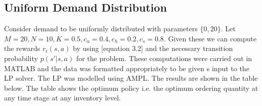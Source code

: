 \documentclass[11pt,a4paper,oneside]{report}
\begin{document}
\subsection{Uniform Demand Distribution}
Consider demand to be uniformly distributed with parameters ${\lbrace0,20\rbrace}$. Let $M = 20, N = 10, K = 0.5, c_u = 0.4, c_h=0.2, c_s=0.8$. Given these we can compute the rewards $r_t(s,a)$ by using [equation 3.2] and the necessary transition probability $p(s'|s,a)$ for the problem. These computations were carried out in MATLAB and the data was formatted appropriately to be given s input to the LP solver. The LP was modelled using AMPL. The results are shown in the table below. The table shows the optimum policy i.e. the optimum ordering quantity at any time stage at any inventory level.
\begin{table}[H]
\centering


\end{table}
\end{document}
